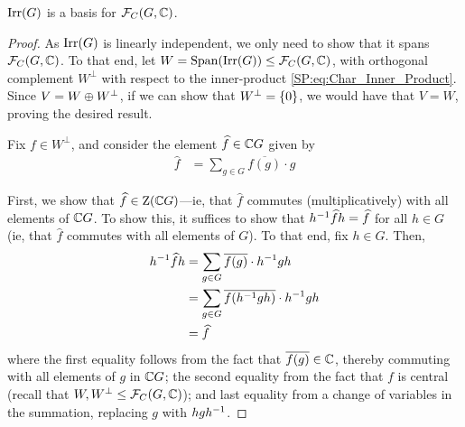 \begin{boxtheorem}
    $\operatorname{Irr}\!\left( G \right)$ is a basis for $\mathcal{F}_C\!\left( G, \mathbb{C} \right)$.
\end{boxtheorem}
\begin{proof}
    As $\operatorname{Irr}\!\left( G \right)$ is linearly independent, we only need to show that it spans $\mathcal{F}_C\!\left( G, \mathbb{C} \right)$. To that end, let $W = \operatorname{Span}\!\left( \operatorname{Irr}\!\left( G \right) \right) \leq \mathcal{F}_C\!\left( G, \mathbb{C} \right)$, with orthogonal complement $W^\perp$ with respect to the inner-product \eqref{SP:eq:Char_Inner_Product}. Since $V = W \oplus W^\perp$, if we can show that $W^\perp = \left\{ 0 \right\}$, we would have that $V = W$, proving the desired result.

    Fix $f \in W^\perp$, and consider the element $\widehat{f} \in \mathbb{C} G$ given by  %
    \begin{align*}
        \hat{f} &= \sum_{g \in G} \overline{f(g)} \cdot g
    \end{align*}

    First, we show that $\widehat{f} \in \operatorname{Z}\!\left( \mathbb{C} G \right)$---ie, that $\hat{f}$ commutes (multiplicatively) with all elements of $\mathbb{C} G$. To show this, it suffices to show that $h^{-1} \widehat{f} h = \widehat{f}$ for all $h \in G$ (ie, that $\hat{f}$ commutes with all elements of $G$). To that end, fix $h \in G$. Then,
    \begin{align*}
        h\inv \hat{f} h &=
        \sum_{g \in G} \overline{f(g)} \cdot h\inv g h \\
        &= \sum_{g \in G} \overline{\fof{h\inv g h}} \cdot h\inv g h \\ %
        &= \hat{f}
    \end{align*}
    where the first equality follows from the fact that $\overline{f(g)} \in \mathbb{C}$, thereby commuting with all elements of $g$ in $\mathbb{C} G$; the second equality from the fact that $f$ is central (recall that $W, W^{\perp} \leq \mathcal{F}_C\!\left( G, \mathbb{C} \right)$); and last equality from a change of variables in the summation, replacing $g$ with $hgh^{-1}$.


\end{proof}

